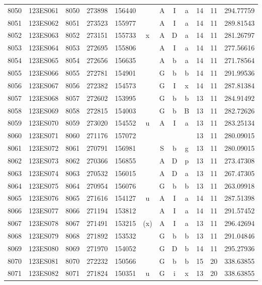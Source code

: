 \begin{tabular}{|*{12}{c|}}
8050 & 123ES061 & 8050 & 273898 & 156440 &  & A & I & a & 14 & 11 & 294.77759 \\ 
8051 & 123ES062 & 8051 & 273523 & 155977 &  & A & I & a & 14 & 11 & 289.81543 \\ 
8052 & 123ES063 & 8052 & 273151 & 155733 & x & A & D & a & 14 & 11 & 281.26797 \\ 
8053 & 123ES064 & 8053 & 272695 & 155806 &  & A & I & a & 14 & 11 & 277.56616 \\ 
8054 & 123ES065 & 8054 & 272656 & 156635 &  & A & b & a & 14 & 11 & 271.78564 \\ 
8055 & 123ES066 & 8055 & 272781 & 154901 &  & G & b & b & 14 & 11 & 291.99536 \\ 
8056 & 123ES067 & 8056 & 272382 & 154573 &  & G & I & x & 14 & 11 & 287.81384 \\ 
8057 & 123ES068 & 8057 & 272602 & 153995 &  & G & b & b & 13 & 11 & 284.91492 \\ 
8058 & 123ES069 & 8058 & 272815 & 154003 &  & G & b & B & 13 & 11 & 282.72626 \\ 
8059 & 123ES070 & 8059 & 273020 & 154552 & u & A & I & a & 13 & 11 & 283.25134 \\ 
8060 & 123ES071 & 8060 & 271176 & 157072 &  &  &  &  & 13 & 11 & 280.09015 \\ 
8061 & 123ES072 & 8061 & 270791 & 156981 &  & S & b & g & 13 & 11 & 280.09015 \\ 
8062 & 123ES073 & 8062 & 270366 & 156855 &  & A & D & p & 13 & 11 & 273.47308 \\ 
8063 & 123ES074 & 8063 & 270532 & 156015 &  & A & D & a & 13 & 11 & 267.47305 \\ 
8064 & 123ES075 & 8064 & 270954 & 156076 &  & G & b & b & 13 & 11 & 263.09918 \\ 
8065 & 123ES076 & 8065 & 271616 & 154127 & u & A & I & a & 14 & 11 & 287.51398 \\ 
8066 & 123ES077 & 8066 & 271194 & 153812 &  & A & I & a & 14 & 11 & 291.57452 \\ 
8067 & 123ES078 & 8067 & 271491 & 153215 & (x) & A & I & a & 13 & 11 & 296.42694 \\ 
8068 & 123ES079 & 8068 & 271892 & 153532 &  & G & b & b & 13 & 11 & 291.04846 \\ 
8069 & 123ES080 & 8069 & 271970 & 154052 &  & G & D & b & 14 & 11 & 295.27936 \\ 
8070 & 123ES081 & 8070 & 272232 & 150566 &  & G & b & b & 15 & 20 & 338.63855 \\ 
8071 & 123ES082 & 8071 & 271824 & 150351 & u & G & i & x & 13 & 20 & 338.63855 \\ 

\end{tabular}

